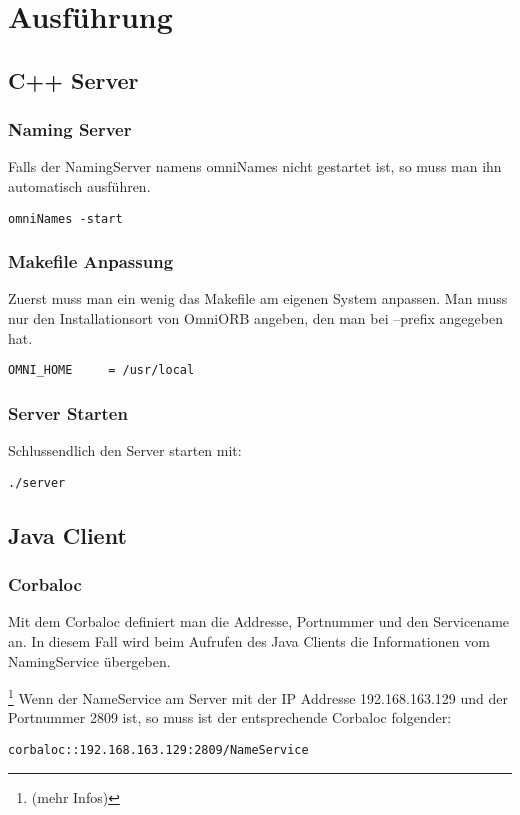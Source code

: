 \documentclass[11pt]{article}
\begin{document}
\section{Ausführung}
\subsection{C++ Server}
\subsubsection{Naming Server}
Falls der NamingServer namens omniNames nicht gestartet ist, so muss man ihn automatisch ausführen.
\begin{lstlisting}
omniNames -start
\end{lstlisting}

\subsubsection{Makefile Anpassung}
Zuerst muss man ein wenig das Makefile am eigenen System anpassen. Man muss nur den Installationsort von OmniORB angeben, den man bei --prefix angegeben hat.
\begin{lstlisting}
OMNI_HOME     = /usr/local
\end{lstlisting}
\subsubsection{Server Starten}
Schlussendlich den Server starten mit:
\begin{lstlisting}
./server
\end{lstlisting}

\subsection{Java Client}
\subsubsection{Corbaloc}
Mit dem Corbaloc definiert man die Addresse, Portnummer und den Servicename an. In diesem Fall wird beim Aufrufen des Java Clients die Informationen vom NamingService übergeben.

\footnote{(mehr Infos\cite{book1})}
Wenn der NameService am Server mit der IP Addresse 192.168.163.129 und der Portnummer 2809 ist, so muss ist der entsprechende Corbaloc folgender:
\begin{lstlisting}
corbaloc::192.168.163.129:2809/NameService
\end{lstlisting}
\end{document}
